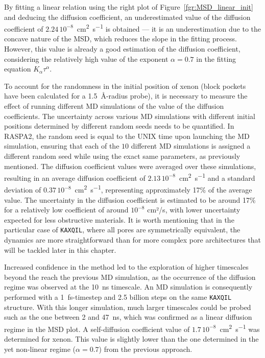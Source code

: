 \documentclass[main]{subfiles}
\begin{document}
By fitting a linear relation using the right plot of Figure~\ref{fgr:MSD_linear_init} and deducing the diffusion coefficient, an underestimated value of the diffusion coefficient of $2.24\,10^{-8}$~\si{\square\cm\per\s} is obtained --- it is an underestimation due to the concave nature of the MSD, which reduces the slope in the fitting process. However, this value is already a good estimation of the diffusion coefficient, considering the relatively high value of the exponent $\alpha=0.7$ in the fitting equation $K_\alpha\tau^\alpha$.

To account for the randomness in the initial position of xenon (block pockets have been calculated for a \SI{1.5}{\angstrom}-radius probe), it is necessary to measure the effect of running different MD simulations of the value of the diffusion coefficients. The uncertainty across various MD simulations with different initial positions determined by different random seeds needs to be quantified. In RASPA2, the random seed is equal to the UNIX time upon launching the MD simulation, ensuring that each of the $10$ different MD simulations is assigned a different random seed while using the exact same parameters, as previously mentioned. The diffusion coefficient values were averaged over these simulations, resulting in an average diffusion coefficient of $2.13\,10^{-8}$~\si{\square\cm\per\s} and a standard deviation of $0.37\,10^{-8}$~\si{\square\cm\per\s}, representing approximately {17\%} of the average value. The uncertainty in the diffusion coefficient is estimated to be around {17\%} for a relatively low coefficient of around $10^{-8}$ cm²/s, with lower uncertainty expected for less obstructive materials. It is worth mentioning that in the particular case of \texttt{KAXQIL}, where all pores are symmetrically equivalent, the dynamics are more straightforward than for more complex pore architectures that will be tackled later in this chapter.

Increased confidence in the method led to the exploration of higher timescales beyond the reach the previous MD simulation, as the occurrence of the diffusion regime was observed at the \SI{10}{\ns} timescale. An MD simulation is consequently performed with a 1~\si{\fs}-timestep and 2.5 billion steps on the same \texttt{KAXQIL} structure. With this longer simulation, much larger timescales could be probed such as the one between {2} and {47}~\si{\ns}, which was confirmed as a linear diffusion regime in the MSD plot. A self-diffusion coefficient value of $1.7\,10^{-8}$~\si{\square\cm\per\s} was determined for xenon. This value is slightly lower than the one determined in the yet non-linear regime ($\alpha=0.7$) from the previous approach.
\end{document}

